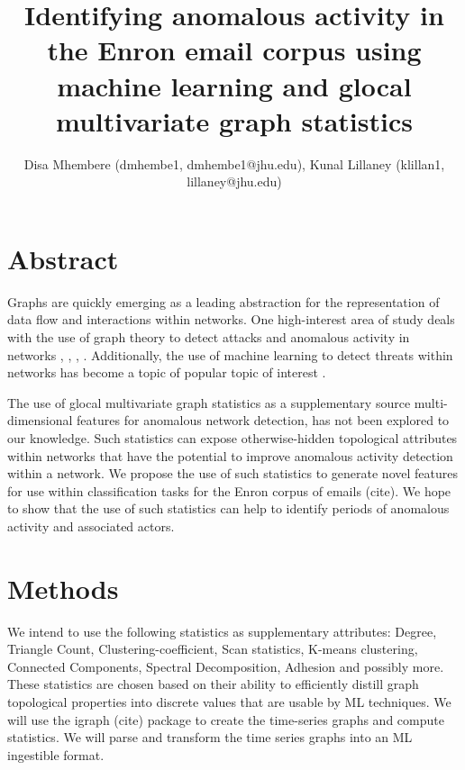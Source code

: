 \documentclass[10pt]{article}
\title{Identifying anomalous activity in the Enron email corpus using machine learning and glocal multivariate graph statistics}
\author{Disa Mhembere (dmhembe1, dmhembe1@jhu.edu), Kunal Lillaney (klillan1, lillaney@jhu.edu)}
\date{}
\begin{document}
\maketitle

\section{Abstract}
Graphs are quickly emerging as a leading abstraction for the representation of data flow and interactions within networks.
One high-interest area of study deals with the use of graph theory to detect attacks and anomalous activity in networks 
\cite{priebe2005scan}, \cite{park2008scan}, \cite{park2009anomaly}, \cite{park2013anomaly}.
Additionally, the use of machine learning to detect threats within networks has become a topic of popular topic of interest \cite{mahoney2003machine}
.

The use of glocal multivariate graph statistics \cite{mhembere2013computing} as a supplementary source multi-dimensional features for anomalous network detection,
has not been explored to our knowledge. Such statistics can expose otherwise-hidden topological attributes within networks that have the potential 
to improve anomalous activity detection within a network. We propose the use of such statistics to generate novel features for use within 
classification tasks for the Enron corpus of emails (cite). We hope to show that the use of such statistics can help to identify periods of anomalous 
activity and associated actors.

\section{Methods} %
We intend to use the following statistics as supplementary attributes: Degree, Triangle Count, Clustering-coefficient,
Scan statistics, K-means clustering, Connected Components, Spectral Decomposition, Adhesion and possibly more. These statistics are
chosen based on their ability to efficiently distill graph topological properties into discrete values that are usable by ML techniques.
We will use the igraph (cite) package to create the time-series graphs and compute statistics. 
We will parse and transform the time series graphs into an ML ingestible format. \newline
\end{document}
